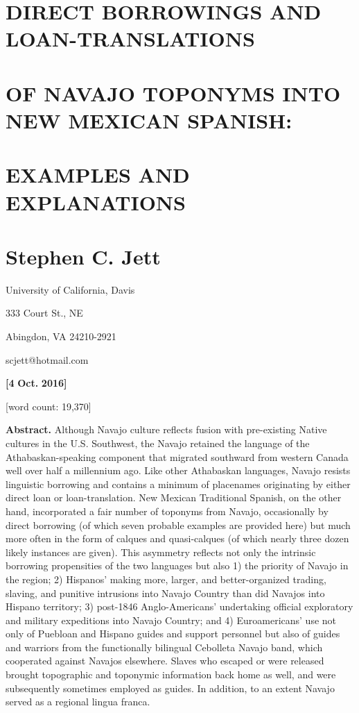 
\section{DIRECT BORROWINGS AND LOAN-TRANSLATIONS} 
\section{OF NAVAJO TOPONYMS INTO NEW MEXICAN SPANISH:} 
\section{EXAMPLES AND EXPLANATIONS}
\section{Stephen C. Jett}

University of California, Davis

333 Court St., NE

Abingdon, VA 24210-2921

scjett@hotmail.com

\textbf{[4} \textbf{Oct.} \textbf{2016]}

[word count: 19,370]

\textbf{Abstract.}  Although Navajo culture reflects fusion with pre-existing Native cultures in the U.S. Southwest, the Navajo retained the language of the Athabaskan-speaking component that migrated southward from western Canada well over half a millennium ago.  Like other Athabaskan languages, Navajo resists linguistic borrowing and contains a minimum of placenames originating by either direct loan or loan-translation.  New Mexican Traditional Spanish, on the other hand, incorporated a fair number of toponyms from Navajo, occasionally by direct borrowing (of which seven probable examples are provided here) but much more often in the form of calques and quasi-calques (of which nearly three dozen likely instances are given).  This asymmetry reflects not only the intrinsic borrowing propensities of the two languages but also 1) the priority of Navajo in the region; 2) Hispanos’ making more, larger, and better-organized trading, slaving, and punitive intrusions into Navajo Country than did Navajos into Hispano territory; 3) post-1846 Anglo-Americans’ undertaking official exploratory and military expeditions into Navajo Country; and 4) Euroamericans’ use not only of Puebloan and Hispano guides and support personnel but also of guides and warriors from the functionally bilingual Cebolleta Navajo band, which cooperated against Navajos elsewhere.  Slaves who escaped or were released brought topographic and toponymic information back home as well, and were subsequently sometimes employed as guides.  In addition, to an extent Navajo served as a regional lingua franca.

